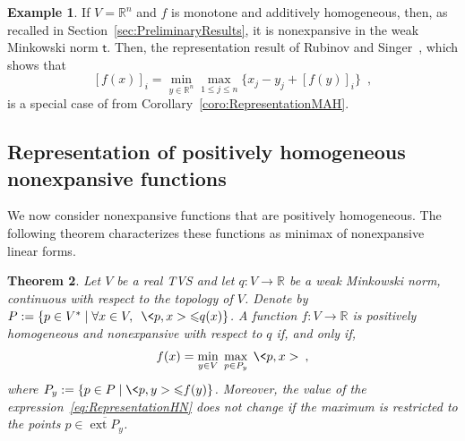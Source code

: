 \documentclass[a4paper,11pt]{amsart}
\newtheorem{theorem}{Theorem}[section]
\theoremstyle{definition}
\newtheorem{example}[theorem]{Example}
\theoremstyle{remark}
\begin{document}
\begin{example}
  If $V = {\mathbb{R}}^n$ and $f$ is monotone and additively homogeneous, then, 
  as recalled in Section~\ref{sec:PreliminaryResults}, it is nonexpansive in the weak Minkowski norm ${\mathsf{t}}$.
  Then, the representation result of Rubinov and Singer~\cite[Theorem 5.3]{RS01b},
  which shows that
  \[
    [f(x)]_i = \min_{y\in {\mathbb{R}}^n} \max_{1{\leqslant} j{\leqslant} n} \{x_j -y_j + [f(y)]_i\} \enspace ,
  \]
  is a special case of from Corollary~\ref{coro:RepresentationMAH}.
\end{example}

\subsection{Representation of positively homogeneous nonexpansive functions}
We now consider nonexpansive functions that are positively homogeneous.
The following theorem characterizes these functions as minimax of nonexpansive linear forms. 

\begin{theorem}
  \label{thm:RepresentationHN}
  Let $V$ be a real TVS and let $q:V \to {\mathbb{R}}$ be a weak Minkowski norm, continuous with respect to the topology of $V$.
  Denote by $P := \{ p \in V^* \mid \forall x \in V, \enspace \<p,x> {\leqslant} q(x) \}$.
  A function $f:V \to {\mathbb{R}}$ is positively homogeneous and nonexpansive with respect to $q$ if, and only if,
  \begin{align}
    \label{eq:RepresentationHN}
    f(x) = \min_{y \in V} \; \max_{p \in P_y} \; \<p,x> \enspace ,
  \end{align}
  where $P_y := \{ p \in P \mid \<p,y> {\leqslant} f(y) \}$.
  Moreover, the value of the expression~\eqref{eq:RepresentationHN} does not change if the maximum is restricted to the points $p \in {\overline{{\operatorname{ext}{P_y}}}}$.
\end{theorem}
\end{document}
